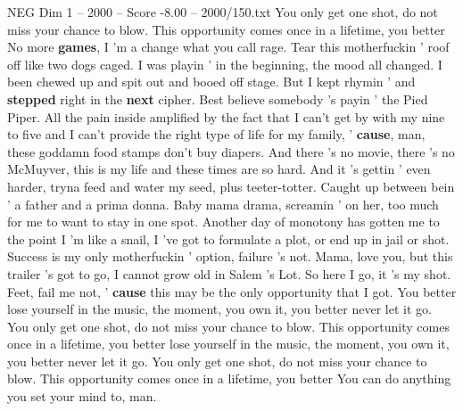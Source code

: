 \begin{textsample}{NEG Dim 1 – 2000 – Score -8.00 – 2000/150.txt}
You only get one shot, do not miss your chance to blow.
This opportunity comes once in a lifetime, you better No more \textbf{games}, I 'm a change what you call rage.
Tear this motherfuckin ' roof off like two dogs caged.
I was playin ' in the beginning, the mood all changed.
I been chewed up and spit out and booed off stage.
But I kept rhymin ' and \textbf{stepped} right in the \textbf{next} cipher.
Best believe somebody 's payin ' the Pied Piper.
All the pain inside amplified by the fact that I can't get by with my nine to five and I can't provide the right type of life for my family, ' \textbf{cause}, man, these goddamn food stamps don't buy diapers.
And there 's no movie, there 's no McMuyver, this is my life and these times are so hard.
And it 's gettin ' even harder, tryna feed and water my seed, plus teeter-totter.
Caught up between bein ' a father and a prima donna.
Baby mama drama, screamin ' on her, too much for me to want to stay in one spot.
Another day of monotony has gotten me to the point I 'm like a snail, I 've got to formulate a plot, or end up in jail or shot.
Success is my only motherfuckin ' option, failure 's not.
Mama, love you, but this trailer 's got to go, I cannot grow old in Salem 's Lot.
So here I go, it 's my shot.
Feet, fail me not, ' \textbf{cause} this may be the only opportunity that I got.
You better lose yourself in the music, the moment, you own it, you better never let it go.
You only get one shot, do not miss your chance to blow.
This opportunity comes once in a lifetime, you better lose yourself in the music, the moment, you own it, you better never let it go.
You only get one shot, do not miss your chance to blow.
This opportunity comes once in a lifetime, you better You can do anything you set your mind to, man.

\end{textsample}
